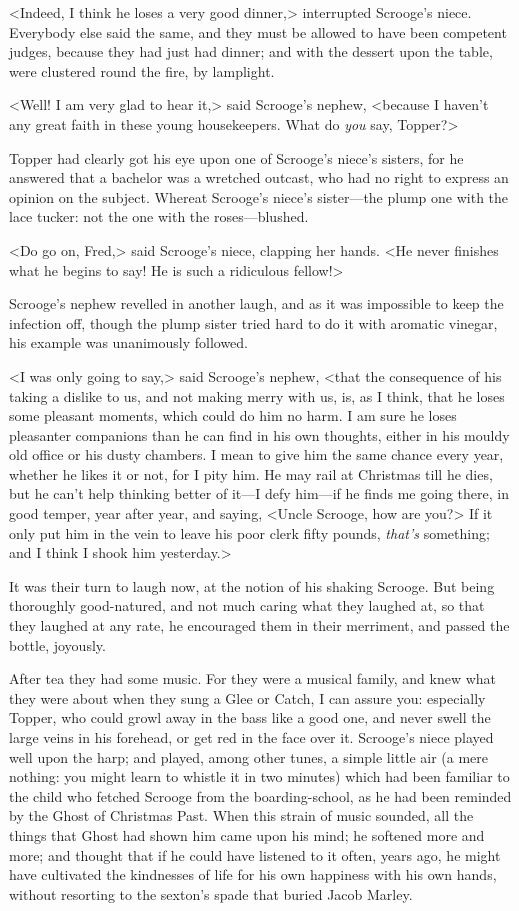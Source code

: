 <Indeed, I think he loses a very good dinner,> interrupted Scrooge's niece.
Everybody else said the same, and they must be allowed to have been competent
judges, because they had just had dinner; and with the dessert upon the table,
were clustered round the fire, by lamplight.

<Well! I am very glad to hear it,> said Scrooge's nephew, <because I haven't any
great faith in these young housekeepers. What do \emph{you} say, Topper?>

Topper had clearly got his eye upon one of Scrooge's niece's sisters, for he
answered that a bachelor was a wretched outcast, who had no right to express an
opinion on the subject. Whereat Scrooge's niece's sister—the plump one with the
lace tucker: not the one with the roses—blushed.

<Do go on, Fred,> said Scrooge's niece, clapping her hands. <He never finishes
what he begins to say! He is such a ridiculous fellow!>

Scrooge's nephew revelled in another laugh, and as it was impossible to keep the
infection off, though the plump sister tried hard to do it with aromatic
vinegar, his example was unanimously followed.

<I was only going to say,> said Scrooge's nephew, <that the consequence of his
taking a dislike to us, and not making merry with us, is, as I think, that he
loses some pleasant moments, which could do him no harm. I am sure he loses
pleasanter companions than he can find in his own thoughts, either in his mouldy
old office or his dusty chambers. I mean to give him the same chance every year,
whether he likes it or not, for I pity him. He may rail at Christmas till he
dies, but he can't help thinking better of it—I defy him—if he finds me going
there, in good temper, year after year, and saying, <Uncle Scrooge, how are
you?> If it only put him in the vein to leave his poor clerk fifty pounds,
\emph{that's} something; and I think I shook him yesterday.>

It was their turn to laugh now, at the notion of his shaking Scrooge. But being
thoroughly good-natured, and not much car\-ing what they laughed at, so that
they laughed at any rate, he encouraged them in their merriment, and passed the
bottle, joyously.

After tea they had some music. For they were a musical family, and knew what
they were about when they sung a Glee or Catch, I can assure you: especially
Topper, who could growl away in the bass like a good one, and never swell the
large veins in his forehead, or get red in the face over it. Scrooge's niece
played well upon the harp; and played, among other tunes, a simple little air (a
mere nothing: you might learn to whistle it in two minutes) which had been
familiar to the child who fetched Scrooge from the boarding-school, as he had
been reminded by the Ghost of Christmas Past. When this strain of music sounded,
all the things that Ghost had shown him came upon his mind; he softened more and
more; and thought that if he could have listened to it often, years ago, he
might have cultivated the kindnesses of life for his own happiness with his own
hands, without resorting to the sexton's spade that buried Jacob Marley.

